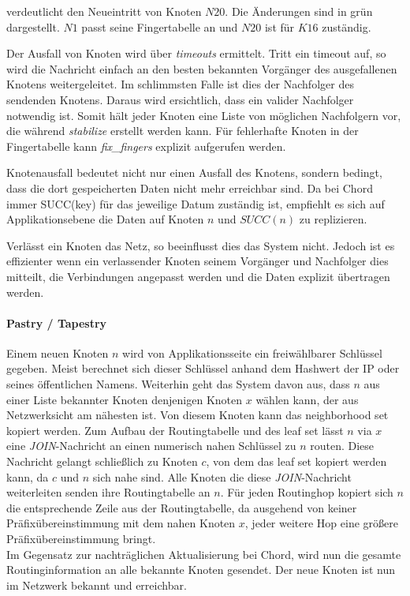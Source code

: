  verdeutlicht den Neueintritt von Knoten $N20$. Die Änderungen sind in grün dargestellt. $N1$ passt seine Fingertabelle an und $N20$ ist für $K16$ zuständig.

Der Ausfall von Knoten wird über \emph{timeouts} ermittelt. Tritt ein timeout auf, so wird die Nachricht einfach an den besten bekannten Vorgänger des ausgefallenen Knotens weitergeleitet. Im schlimmsten Falle ist dies der Nachfolger des sendenden Knotens. Daraus wird ersichtlich, dass ein valider Nachfolger notwendig ist. Somit hält jeder Knoten eine Liste von möglichen Nachfolgern vor, die während \emph{stabilize} erstellt werden kann. Für fehlerhafte Knoten in der Fingertabelle kann \emph{fix\_fingers} explizit aufgerufen werden.

Knotenausfall bedeutet nicht nur einen Ausfall des Knotens, sondern bedingt, dass die dort gespeicherten Daten nicht mehr erreichbar sind. Da bei Chord immer SUCC(key) für das jeweilige Datum zuständig ist, empfiehlt es sich auf Applikationsebene die Daten auf Knoten $n$ und $SUCC(n)$ zu replizieren.

Verlässt ein Knoten das Netz, so beeinflusst dies das System nicht. Jedoch ist es effizienter wenn ein verlassender Knoten seinem Vorgänger und Nachfolger dies mitteilt, die Verbindungen angepasst werden und die Daten explizit übertragen werden.

\paragraph{Pastry / Tapestry}
Einem neuen Knoten $n$ wird von Applikationsseite ein freiwählbarer Schlüssel gegeben. Meist berechnet sich dieser Schlüssel anhand dem Hashwert der IP oder seines öffentlichen Namens. Weiterhin geht das System davon aus, dass $n$ aus einer Liste bekannter Knoten denjenigen Knoten $x$ wählen kann, der aus Netzwerksicht am nähesten ist. Von diesem Knoten kann das neighborhood set kopiert werden. Zum Aufbau der Routingtabelle und des leaf set lässt $n$ via $x$ eine \emph{JOIN}-Nachricht an einen numerisch nahen Schlüssel zu $n$ routen. Diese Nachricht gelangt schließlich zu Knoten $c$, von dem das leaf set kopiert werden kann, da $c$ und $n$ sich nahe sind. Alle Knoten die diese \emph{JOIN}-Nachricht weiterleiten senden ihre Routingtabelle an $n$. Für jeden Routinghop kopiert sich $n$ die entsprechende Zeile aus der Routingtabelle, da ausgehend von keiner Präfixübereinstimmung mit dem nahen Knoten $x$, jeder weitere Hop eine größere Präfixübereinstimmung bringt.\\
Im Gegensatz zur nachträglichen Aktualisierung bei Chord, wird nun die gesamte Routinginformation an alle bekannte Knoten gesendet. Der neue Knoten ist nun im Netzwerk bekannt und erreichbar.

